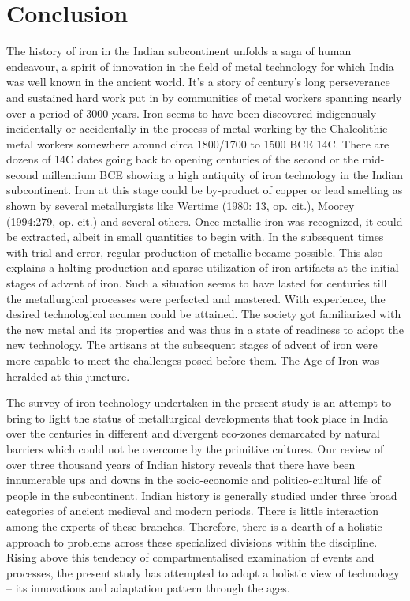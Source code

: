 \chapter{Conclusion}\label{chapter8}




The history of iron in the Indian subcontinent unfolds a saga of human endeavour, a spirit of innovation in the field of metal technology for which India was well known in the ancient world. It’s a story of century’s long perseverance and sustained hard work put in by communities of metal workers spanning nearly over a period of 3000 years. Iron seems to have been discovered indigenously incidentally or accidentally in the process of metal working by the Chalcolithic metal workers somewhere around circa 1800/1700 to 1500 BCE 14C. There are dozens of 14C dates going back to opening centuries of the second or the mid- second millennium BCE showing a high antiquity of iron technology in the Indian subcontinent. Iron at this stage could be by-product of copper or lead smelting as shown by several metallurgists like Wertime (1980: 13, op. cit.), Moorey (1994:279, op. cit.) and several others. Once metallic iron was recognized, it could be extracted, albeit in small quantities to begin with. In the subsequent times with trial and error, regular production of metallic became possible. This also explains a halting production and sparse utilization of iron artifacts at the initial stages of advent of iron. Such a situation seems to have lasted for centuries till the metallurgical processes were perfected and mastered. With experience, the desired technological acumen could be attained. The society got familiarized with the new metal and its properties and was thus in a state of readiness to adopt the new technology. The artisans at the subsequent stages of advent of iron were more capable to meet the challenges posed before them. The Age of Iron was heralded at this juncture.  

The survey of iron technology undertaken in the present study is an attempt to bring to light the status of metallurgical developments that took place in India over the centuries in different and divergent eco-zones demarcated by natural barriers which could not be overcome by the primitive cultures. Our review of over three thousand years of Indian history reveals that there have been innumerable ups and downs in the socio-economic and politico-cultural life of people in the subcontinent. Indian history is generally studied under three broad categories of ancient medieval and modern periods. There is little interaction among the experts of these branches. Therefore, there is a dearth of a holistic approach to problems across these specialized divisions within the discipline. Rising above this tendency of compartmentalised examination of events and processes, the present study has attempted to adopt a holistic view of technology – its innovations and adaptation pattern through the ages. 

